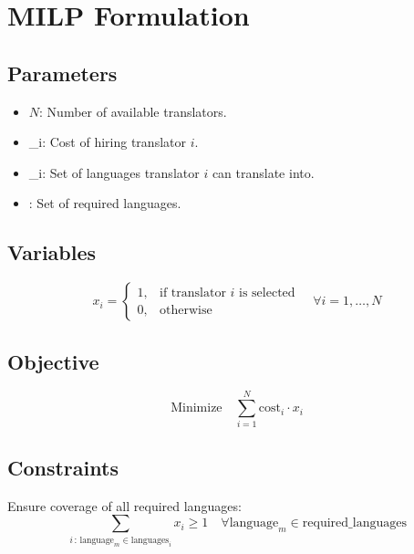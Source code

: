 \documentclass{article}
\begin{document}
\section*{MILP Formulation}

\subsection*{Parameters}
\begin{itemize}
    \item \( N \): Number of available translators.
    \item {}_i: Cost of hiring translator \( i \).
    \item {}_i: Set of languages translator \( i \) can translate into.
    \item {}: Set of required languages.
\end{itemize}

\subsection*{Variables}
\[
x_i = 
\begin{cases} 
1, & \text{if translator } i \text{ is selected} \\
0, & \text{otherwise}
\end{cases}
\quad \forall i = 1, \ldots, N
\]

\subsection*{Objective}
\[
\text{Minimize} \quad \sum_{i=1}^{N} \text{cost}_i \cdot x_i
\]

\subsection*{Constraints}
Ensure coverage of all required languages:
\[
\sum_{i \,:\, \text{language}_m \in \text{languages}_i} x_i \geq 1 \quad \forall \text{language}_m \in \text{required\_languages}
\]
\end{document}

